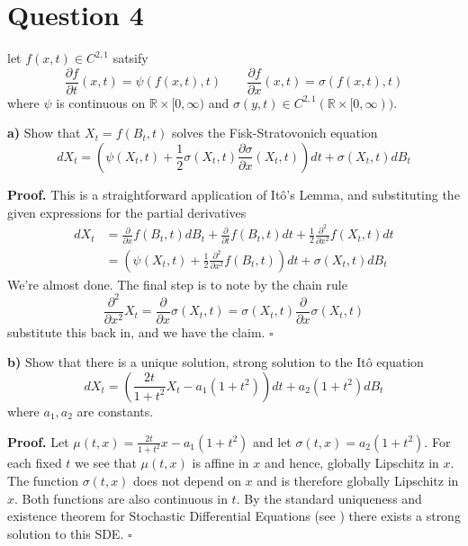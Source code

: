 \documentclass{article}
\begin{document}
\section{Question 4}
\begin{tcolorbox}
[colframe=black,colback=gray!5,boxrule=0.5pt]
  let $f(x,t)\in C^{2,1}$ satsify
  $$\frac{\partial f}{\partial t}(x,t) = \psi(f(x,t),t) \quad\quad \frac{\partial f}{\partial x}(x,t) = \sigma(f(x,t),t)$$
  where $\psi$ is continuous on $\mathbb{R}\times[0,\infty)$ and $\sigma(y,t)\in C^{2,1}(\mathbb{R}\times[0,\infty)).$ 
\end{tcolorbox}
\begin{tcolorbox}
[colframe=black,colback=gray!5,boxrule=0.5pt]
 \textbf{a)} Show that $X_t = f(B_t, t)$ solves the Fisk-Stratovonich equation
 $$dX_t = \left(\psi(X_t,t) + \frac{1}{2}\sigma(X_t,t)\frac{\partial \sigma}{\partial x}(X_t,t)\right)dt + \sigma(X_t,t)dB_t$$
\end{tcolorbox}
\textbf{Proof.} This is a straightforward application of Itô's Lemma, and substituting the given expressions for the partial derivatives
\begin{align*}
    dX_t &= \frac{\partial}{\partial x}f(B_t, t)dB_t + \frac{\partial}{\partial t}f(B_t, t)dt + \frac{1}{2}\frac{\partial^2}{\partial x^2}f(X_t, t)dt \\
    &= \left(\psi(X_t,t) + \frac{1}{2}\frac{\partial^2 }{\partial x^2}f(B_t,t)\right)dt + \sigma(X_t,t)dB_t
\end{align*}
We're almost done. The final step is to note by the chain rule
$$\frac{\partial^2 }{\partial x^2} X_t = \frac{\partial}{\partial x}\sigma(X_t,t) = \sigma(X_t,t)\frac{\partial}{\partial x}\sigma(X_t,t)$$
substitute this back in, and we have the claim. $\square$

\begin{tcolorbox}
[colframe=black,colback=gray!5,boxrule=0.5pt]
 \textbf{b)} Show that there is a unique solution, strong solution to the Itô equation
 $$dX_t = \left(\frac{2t}{1+t^2}X_t - a_1(1+t^2)\right)dt + a_2(1+t^2)dB_t$$
 where $a_1, a_2$ are constants. 
\end{tcolorbox}
\textbf{Proof.} Let $\mu(t,x) = \frac{2t}{1+t^2}x - a_1(1+t^2)$ and let $\sigma(t,x) = a_2(1+t^2)$. For each fixed $t$ we see that $\mu(t,x)$ is affine in $x$ and hence, globally Lipschitz in $x$. The function $\sigma(t,x)$ does not depend on $x$ and is therefore globally Lipschitz in $x$. Both functions are also continuous in $t$. 
By the standard uniqueness and existence theorem for Stochastic Differential Equations (see \cite{Fima}) there exists a strong solution to this SDE. $\square$
\end{document}
